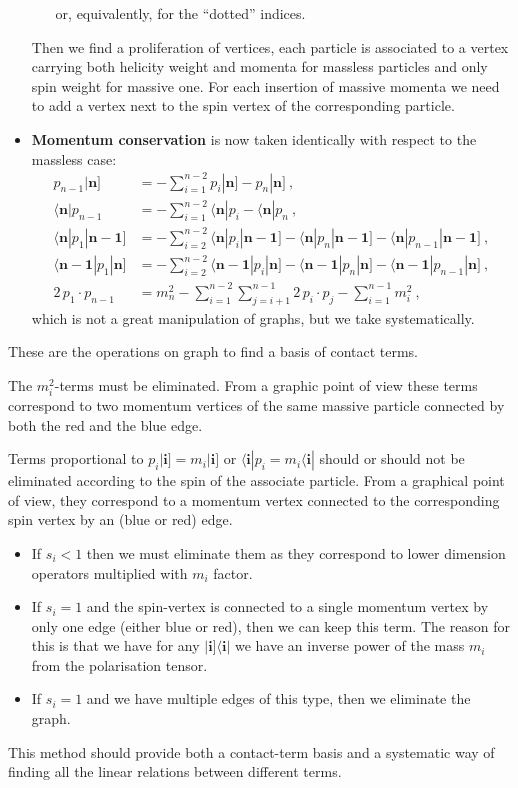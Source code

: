 \documentclass[aps,prd,nofootinbib,twocolumn,10pt]{revtex4-2}
\begin{document}
\begin{itemize}
\begin{enumerate}
\begin{equation}
		\end{equation}
		or, equivalently, for the “dotted” indices.
	\end{enumerate}
	Then we ﬁnd a proliferation of vertices, each particle is associated to a vertex carrying both helicity weight and momenta for massless particles and only spin weight for massive one. For each insertion of massive momenta we need to add a vertex next to the spin vertex of the corresponding particle.
	\item \textbf{Momentum conservation} is now taken identically with respect to the massless case:
	\begin{align}
		p_{n-1} | \mathbf{n} ] &= - \sum_{i=1}^{n-2} p_{i} | \mathbf{n} ] - p_{n} | \mathbf{n} ]\ ,\\
		\langle \mathbf{n}| p_{n-1} & = - \sum_{i=1}^{n-2} \langle \mathbf{n}| p_{i}  - \langle \mathbf{n}| p_{n}\ ,\\
		\langle \mathbf{n}| p_{1} | \mathbf{n-1} ] & = - \sum_{i=2}^{n-2} \langle \mathbf{n}| p_{i} | \mathbf{n-1} ] - \langle \mathbf{n}| p_{n} | \mathbf{n-1} ] - \langle \mathbf{n}| p_{n-1} | \mathbf{n-1} ]\ ,\\
		\langle \mathbf{n-1}| p_{1} | \mathbf{n} ] & = - \sum_{i=2}^{n-2} \langle \mathbf{n-1}| p_{i} | \mathbf{n} ] - \langle \mathbf{n-1}| p_{n} | \mathbf{n} ] - \langle \mathbf{n-1}| p_{n-1} | \mathbf{n} ]\ ,\\
		2\,  p_{1}\cdot p_{n-1} &= m_n^2 - \sum_{i=1}^{n-2} \sum_{j=i+1}^{n-1} 2\, p_{i}\cdot p_{j} - \sum_{i=1}^{n-1} m_i^2\ ,
	\end{align}
	which is not a great manipulation of graphs, but we take systematically.
\end{itemize}
These are the operations on graph to ﬁnd a basis of contact terms.

The $m_i^2$-terms must be eliminated. From a graphic point of view these terms correspond to two momentum vertices of the same massive particle connected by both the red and the blue edge.

Terms proportional to $p_i |\mathbf{i}] = m_i |\mathbf{i}]$ or $\langle \mathbf{i}| p_i = m_i \langle \mathbf{i}|$ should or should not be eliminated according to the spin of the associate particle. From a graphical point of view, they correspond to a momentum vertex connected to the corresponding spin vertex by an (blue or red) edge.
\begin{itemize}
	\item If $s_i< 1$ then we must eliminate them as they correspond to lower dimension operators multiplied with $m_i$ factor.
	\item If $s_i= 1$ and the spin-vertex is connected to a single momentum vertex by only one edge (either blue or red), then we can keep this term. The reason for this is that we have for any $|\mathbf{i}]\langle \mathbf{i}|$ we have an inverse power of the mass $m_i$ from the polarisation tensor.
	\item If $s_i= 1$ and we have multiple edges of this type, then we eliminate the graph.
\end{itemize}
This method should provide both a contact-term basis and a systematic way of finding all the linear relations between different terms.
\end{document}
